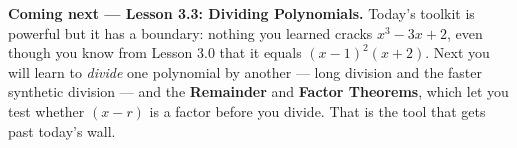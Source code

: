 \documentclass[10pt]{article}
\begin{document}
\begin{spiralbox}
\textbf{Coming next --- Lesson 3.3: Dividing Polynomials.} Today's toolkit is powerful but it has a
boundary: nothing you learned cracks $x^3 - 3x + 2$, even though you know from Lesson 3.0 that it
equals $(x-1)^2(x+2)$. Next you will learn to \emph{divide} one polynomial by another --- long
division and the faster synthetic division --- and the \textbf{Remainder} and \textbf{Factor
Theorems}, which let you test whether $(x-r)$ is a factor before you divide. That is the tool that
gets past today's wall.
\end{spiralbox}
\end{document}
